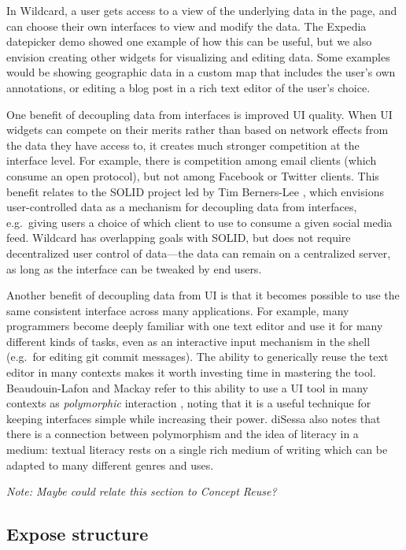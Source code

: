 \documentclass[english,submission]{programming}
\begin{document}
In Wildcard, a user gets access to a view of the underlying data in the
page, and can choose their own interfaces to view and modify the data.
The Expedia datepicker demo showed one example of how this can be
useful, but we also envision creating other widgets for visualizing and
editing data. Some examples would be showing geographic data in a custom
map that includes the user's own annotations, or editing a blog post in
a rich text editor of the user's choice.

One benefit of decoupling data from interfaces is improved UI quality.
When UI widgets can compete on their merits rather than based on network
effects from the data they have access to, it creates much stronger
competition at the interface level. For example, there is competition
among email clients (which consume an open protocol), but not among
Facebook or Twitter clients. This benefit relates to the SOLID project
led by Tim Berners-Lee \autocite{berners-lee2018}, which envisions
user-controlled data as a mechanism for decoupling data from interfaces,
e.g.~giving users a choice of which client to use to consume a given
social media feed. Wildcard has overlapping goals with SOLID, but does
not require decentralized user control of data---the data can remain on
a centralized server, as long as the interface can be tweaked by end
users.

Another benefit of decoupling data from UI is that it becomes possible
to use the same consistent interface across many applications. For
example, many programmers become deeply familiar with one text editor
and use it for many different kinds of tasks, even as an interactive
input mechanism in the shell (e.g.~for editing git commit messages). The
ability to generically reuse the text editor in many contexts makes it
worth investing time in mastering the tool. Beaudouin-Lafon and Mackay
refer to this ability to use a UI tool in many contexts as
\emph{polymorphic} interaction \autocite{beaudouin-lafon2000}, noting
that it is a useful technique for keeping interfaces simple while
increasing their power. diSessa also \autocite{disessa2000} notes that
there is a connection between polymorphism and the idea of literacy in a
medium: textual literacy rests on a single rich medium of writing which
can be adapted to many different genres and uses.

\emph{Note: Maybe could relate this section to Concept Reuse?}

\hypertarget{expose-structure}{%
\subsection{Expose structure}\label{expose-structure}}
\end{document}
